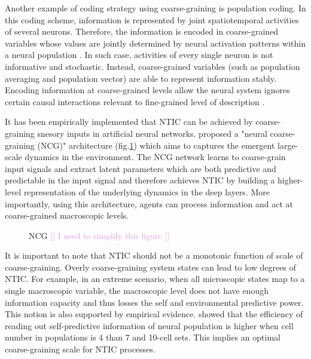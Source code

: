 \documentclass[utf8]{article}
\newcommand{\includegraphicsTodo}[2][]{%
            \tcbox[enhanced,
                center,
            	adjusted title=\large To Be Modified ...,
            	halign title=center,
            	attach boxed title to top left={yshift=-3mm, xshift=1cm,yshifttext=-1mm}, boxed title style={drop fuzzy shadow},
            	colbacktitle=RedOrange!70!black,
            	coltitle=white,
            	colframe=RedOrange!50!black,
            	colback=white
        	]{\texttt{[image: \#2]}}}
\newcommand{\idea}[2][Plum]{\noindent
				\textcolor{#1}{[[ #2 ]]}}
\begin{document}
		Another example of coding strategy using coarse-graining is population coding. In this coding scheme, information is represented by joint spatiotemporal activities of several neurons. Therefore, the information is encoded in coarse-grained variables whose values are jointly determined by neural activation patterns within a neural population \citep{kristan1997population, pouget2000information, binder2009encyclopedia, QuianQuiroga2009}. In such case, activities of every single neuron is not informative and stochastic. Instead, coarse-grained variables (such as population averaging and population vector) are able to represent information stably. Encoding information at coarse-grained levels allow the neural system ignores certain causal interactions relevant to fine-grained level of description \citep{Woodward2007-WOOCWA}.
			
			
		It has been empirically implemented that NTIC can be achieved by coarse-graining snesory inputs in artificial neural networks. \citep{guttenberg2016neural} proposed a "neural coarse-graining (NCG)" architecture (fig.\ref{fig:NCG}) which aims to captures the emergent large-scale dynamics in the environment. The NCG network learns to coarse-grain input signals and extract latent parameters which are both predictive and predictable in the input signal and therefore achieves NTIC by building a higher-level representation of the underlying dynamics in the deep layers. More importantly, using this architecture, agents can process information and act at coarse-grained macroscopic levels.
		
		\begin{figure}
			\includegraphicsTodo[width=0.8\textwidth]{WritingMaterials/PDFXCview_2018-06-08_14-24-03.png}
			\caption{NCG \idea{I need to simplify this figure}\citep{guttenberg2016neural}}
			\label{fig:NCG}
		\end{figure}		
		

		It is important to note that NTIC should not be a monotonic function of scale of coarse-graining. Overly coarse-graining system states can lead to low degrees of NTIC. For example, in an extreme scenario, when all microscopic states map to a single macroscopic variable, the macroscopic level does not have enough information capacity and thus losses  the self and environmental predictive power. This notion is also supported by empirical evidence. \cite{sederberg2018learning} showed that the efficiency of reading out  self-predictive information of neural population is higher when cell number in populations is 4 than 7 and 10-cell sets. This implies an optimal coarse-graining scale for NTIC processes. %
\end{document}
